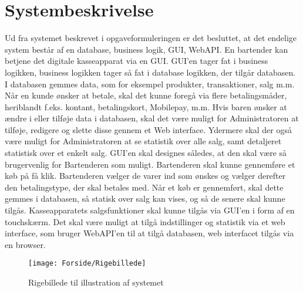 \chapter{Systembeskrivelse}

Ud fra systemet beskrevet i opgaveformuleringen er det besluttet, at det endelige system består af en database, business logik, \gls{GUI}, \gls{WebAPI}. 
\newline\newline
En bartender kan betjene det digitale kasseapparat via en \gls{GUI}. \gls{GUI}'en tager fat i business logikken, business logikken tager så fat i database logikken, der tilgår databasen. I databasen gemmes data, som for eksempel produkter, transaktioner, salg m.m.
Når en kunde ønsker at betale, skal det kunne foregå via flere betalingsmåder, heriblandt f.eks. kontant, betalingskort, Mobilepay, m.m.
\newline\newline
Hvis baren ønsker at ændre i eller tilføje data i databasen, skal det være muligt for Administratoren at tilføje, redigere og slette disse gennem et Web interface. Ydermere skal der også være muligt for Administratoren at se statistik over alle salg, samt detaljeret statistisk over et enkelt salg. 
\newline\newline
\gls{GUI}'en skal designes således, at den skal være så brugervenlig for Bartenderen som muligt. Bartenderen skal kunne gennemføre et køb på få klik. Bartenderen vælger de varer ind som ønskes og vælger derefter den betalingstype, der skal betales med. Når et køb er gennemført, skal dette gemmes i databasen, så statisk over salg kan vises, og så de senere skal kunne tilgås. 
\newline\newline
Kasseapparatets salgsfunktioner skal kunne tilgås via \gls{GUI}'en i form af en touchskærm. Det skal være muligt at tilgå indstillinger og statistik via et web interface, som bruger \gls{WebAPI}'en til at tilgå databasen, web interfacet tilgås via en browser. 
                  
\begin{figure}[h]
    \centering
    \texttt{[image: Forside/Rigebillede]}
    \caption{Rigebillede til illustration af systemet}
    \label{fig:rig_billede}
\end{figure}